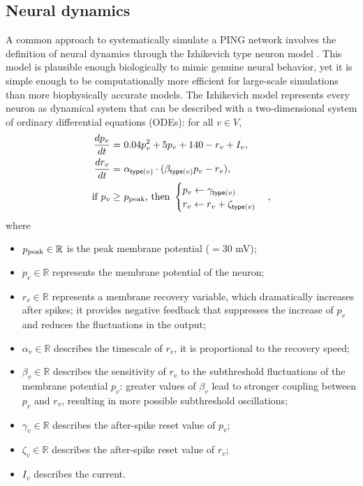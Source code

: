 \subsection{Neural dynamics}
\label{sec:neural-dynamics}

A common approach to systematically simulate a PING network involves the definition of neural dynamics through the Izhikevich type neuron model  \cite{Izhikevich2003}. This model is plausible enough biologically to mimic genuine neural behavior, yet it is simple enough to be computationally more efficient for large-scale simulations than more biophysically accurate models. The Izhikevich model represents every neuron as dynamical system that can be described with a two-dimensional system of ordinary differential equations (ODEs): for all $v \in V$,
\begin{align}
    \frac{dp_v}{dt} =\ & 0.04 p_v^2 + 5p_v + 140 - r_v + I_v,
    \label{eq:Izhikevich-model-dp-dt} \\
    \frac{dr_v}{dt} =\ & \alpha_{\mathsf{type}(v)} \cdot (\beta_{\mathsf{type}(v)} p_v - r_v), \label{eq:Izhikevich-model-dr-dt} \\
    \text{if } p_v \geq\ & p_{\mathrm{peak}} \text{, then } 
    \begin{cases}
        p_v \leftarrow \gamma_{\mathsf{type}(v)} \\
        r_v \leftarrow r_v + \zeta_{\mathsf{type}(v)}
    \end{cases}, 
    \label{eq:Izhikevich-model-p30}
\end{align}
where
\begin{itemize}
    \item $p_{\mathrm{peak}} \in \mathbb{R}$ is the peak membrane potential ($= 30$ mV);
    
    \item $p_v \in \mathbb{R}$ represents the membrane potential of the neuron; 
    
    \item $r_v \in \mathbb{R}$ represents a membrane recovery variable, which dramatically increases after spikes; it provides negative feedback that suppresses the increase of $p_v$ and reduces the fluctuations in the output;
    
    \item $\alpha_v \in \mathbb{R}$ describes the timescale of $r_v$, it is proportional to the recovery speed;
    
    \item $\beta_v \in \mathbb{R}$ describes the sensitivity of $r_v$ to the subthreshold fluctuations of the membrane potential $p_v$: greater values of $\beta_v$ lead to stronger coupling between $p_v$ and $r_v$, resulting in more possible subthreshold oscillations;
    
    \item $\gamma_v \in \mathbb{R}$ describes the after-spike reset value of $p_v$;
    
    \item $\zeta_v \in \mathbb{R}$ describes the after-spike reset value of $r_v$;
    
    \item $I_v$ describes the current.
\end{itemize}
